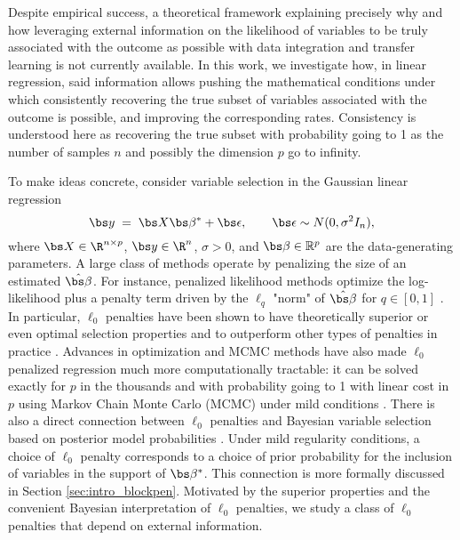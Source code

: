 \documentclass{article}
\begin{document}
Despite empirical success, a theoretical framework explaining precisely why and how leveraging external information on the likelihood of variables to be truly associated with the outcome as possible with data integration and transfer learning is not currently available. In this work, we investigate how, in linear regression, said information allows pushing the mathematical conditions under which consistently recovering the true subset of variables associated with the outcome is possible, and improving the corresponding rates. Consistency is understood here as recovering the true subset with probability going to 1 as the number of samples $n$ and possibly the dimension $p$ go to infinity. 

To make ideas concrete, consider variable selection in the Gaussian linear regression
\begin{equation}\label{eq:linearmodel}
	\bs y \;=\; \bs X \bs \beta^* + \bs\epsilon,\qquad \bs \epsilon \sim N(0,\sigma^2 I_n),
\end{equation}
where $\bs X\in \R^{n\times p}$, $\bs y\in \R^n$, $\sigma >0$, and $\bs \beta \in \mathbb{R}^p$ are the data-generating parameters. A large class of methods operate by penalizing the size of an estimated $\hat{\bs  \beta}$. For instance, penalized likelihood methods optimize the log-likelihood plus a penalty term driven by the $\ell_q$ "norm" of $\hat{\bs  \beta}$ for $q\in [0,1]$ \citep{lasso,bertsimas}. In particular, $\ell_0$ penalties have been shown to have theoretically superior or even optimal selection properties \cite{infotheowainwright, XXXbyon} and to outperform other types of penalties in practice \cite{mazumder2020}. Advances in optimization and MCMC methods have also made $\ell_0$ penalized regression much more computationally tractable: it can be solved exactly for $p$ in the thousands \citep{bertsimas2020sparse} and with probability going to 1 with linear cost in $p$ using Markov Chain Monte Carlo (MCMC) under mild conditions \citep{Yang2016,zhou2022}. There is also a direct connection between $\ell_0$ penalties and Bayesian variable selection based on posterior model probabilities \citep{BIC,EBIC,rossell2022concentration}. Under mild regularity conditions, a choice of $\ell_0$ penalty corresponds to a choice of prior probability for the inclusion of variables in the support of $\bs \beta^*$. This connection is more formally discussed in Section \ref{sec:intro_blockpen}. Motivated by the superior properties and the convenient Bayesian interpretation of $\ell_0$ penalties, we study a class of $\ell_0$ penalties that depend on external information.
\end{document}
